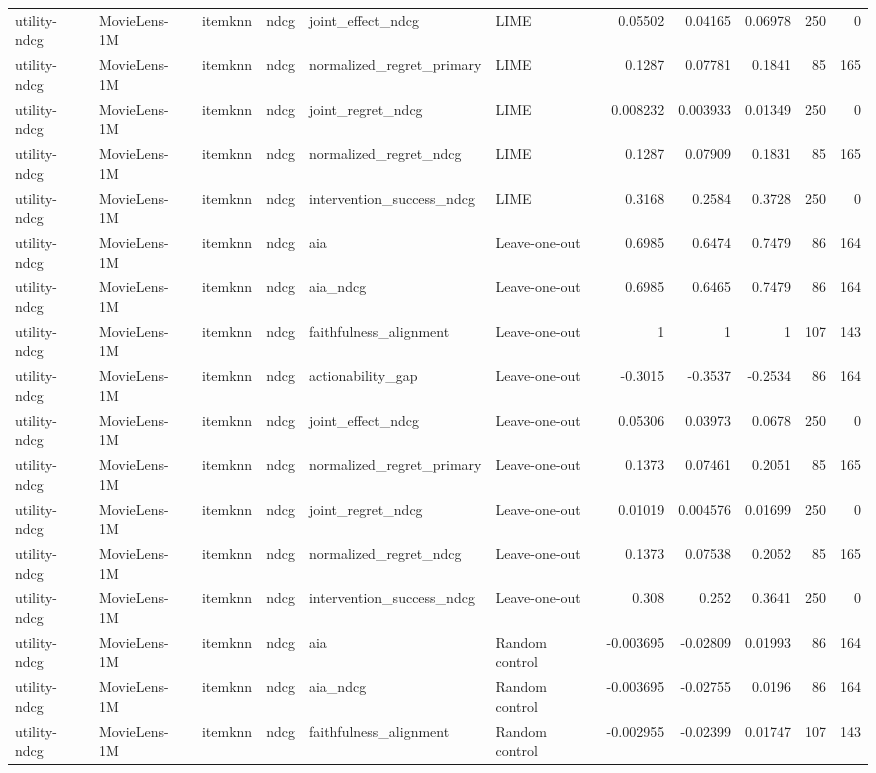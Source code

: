 \begin{table}[t]
{\begin{tabular}{llllllrrrrr}
utility-ndcg & MovieLens-1M & itemknn & ndcg & joint\_effect\_ndcg & LIME & 0.05502 & 0.04165 & 0.06978 & 250 & 0 \\
utility-ndcg & MovieLens-1M & itemknn & ndcg & normalized\_regret\_primary & LIME & 0.1287 & 0.07781 & 0.1841 & 85 & 165 \\
utility-ndcg & MovieLens-1M & itemknn & ndcg & joint\_regret\_ndcg & LIME & 0.008232 & 0.003933 & 0.01349 & 250 & 0 \\
utility-ndcg & MovieLens-1M & itemknn & ndcg & normalized\_regret\_ndcg & LIME & 0.1287 & 0.07909 & 0.1831 & 85 & 165 \\
utility-ndcg & MovieLens-1M & itemknn & ndcg & intervention\_success\_ndcg & LIME & 0.3168 & 0.2584 & 0.3728 & 250 & 0 \\
utility-ndcg & MovieLens-1M & itemknn & ndcg & aia & Leave-one-out & 0.6985 & 0.6474 & 0.7479 & 86 & 164 \\
utility-ndcg & MovieLens-1M & itemknn & ndcg & aia\_ndcg & Leave-one-out & 0.6985 & 0.6465 & 0.7479 & 86 & 164 \\
utility-ndcg & MovieLens-1M & itemknn & ndcg & faithfulness\_alignment & Leave-one-out & 1 & 1 & 1 & 107 & 143 \\
utility-ndcg & MovieLens-1M & itemknn & ndcg & actionability\_gap & Leave-one-out & -0.3015 & -0.3537 & -0.2534 & 86 & 164 \\
utility-ndcg & MovieLens-1M & itemknn & ndcg & joint\_effect\_ndcg & Leave-one-out & 0.05306 & 0.03973 & 0.0678 & 250 & 0 \\
utility-ndcg & MovieLens-1M & itemknn & ndcg & normalized\_regret\_primary & Leave-one-out & 0.1373 & 0.07461 & 0.2051 & 85 & 165 \\
utility-ndcg & MovieLens-1M & itemknn & ndcg & joint\_regret\_ndcg & Leave-one-out & 0.01019 & 0.004576 & 0.01699 & 250 & 0 \\
utility-ndcg & MovieLens-1M & itemknn & ndcg & normalized\_regret\_ndcg & Leave-one-out & 0.1373 & 0.07538 & 0.2052 & 85 & 165 \\
utility-ndcg & MovieLens-1M & itemknn & ndcg & intervention\_success\_ndcg & Leave-one-out & 0.308 & 0.252 & 0.3641 & 250 & 0 \\
utility-ndcg & MovieLens-1M & itemknn & ndcg & aia & Random control & -0.003695 & -0.02809 & 0.01993 & 86 & 164 \\
utility-ndcg & MovieLens-1M & itemknn & ndcg & aia\_ndcg & Random control & -0.003695 & -0.02755 & 0.0196 & 86 & 164 \\
utility-ndcg & MovieLens-1M & itemknn & ndcg & faithfulness\_alignment & Random control & -0.002955 & -0.02399 & 0.01747 & 107 & 143 \\

\end{tabular}}
\end{table}
